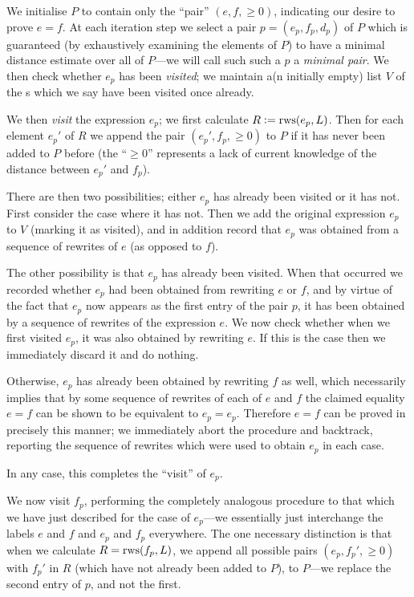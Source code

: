 \documentclass[12pt]{article}
\begin{document}
We initialise $P$ to contain only the ``pair'' $(e, f, \geq 0)$, indicating our desire to prove $e = f$. At each iteration step we select a pair $p = (e_p, f_p, d_p)$ of $P$ which is guaranteed (by exhaustively examining the elements of $P$) to have a minimal distance estimate over all of $P$---we will call such such a $p$ a \textit{minimal pair}. We then check whether $e_p$ has been \textit{visited}; we maintain a(n initially empty) list $V$ of the \expr{}s which we say have been visited once already.

We then \textit{visit} the expression $e_p$; we first calculate $R := \operatorname{rws}(e_p, L)$. Then for each element $e_p'$ of $R$ we append the pair $(e_p', f_p, \geq 0)$ to $P$ if it has never been added to $P$ before (the ``$\geq 0$'' represents a lack of current knowledge of the distance between $e_p'$ and $f_p$).

There are then two possibilities; either $e_p$ has already been visited or it has not. First consider the case where it has not. Then we add the original expression $e_p$ to $V$ (marking it as visited), and in addition record that $e_p$ was obtained from a sequence of rewrites of $e$ (as opposed to $f$).

The other possibility is that $e_p$ has already been visited. When that occurred we recorded whether $e_p$ had been obtained from rewriting $e$ or $f$, and by virtue of the fact that $e_p$ now appears as the first entry of the pair $p$, it has been obtained by a sequence of rewrites of the expression $e$. We now check whether when we first visited $e_p$, it was also obtained by rewriting $e$. If this is the case then we immediately discard it and do nothing.

Otherwise, $e_p$ has already been obtained by rewriting $f$ as well, which necessarily implies that by some sequence of rewrites of each of $e$ and $f$ the claimed equality $e = f$ can be shown to be equivalent to $e_p = e_p$. Therefore $e = f$ can be proved in precisely this manner; we immediately abort the procedure and backtrack, reporting the sequence of rewrites which were used to obtain $e_p$ in each case.

In any case, this completes the ``visit'' of $e_p$.

We now visit $f_p$, performing the completely analogous procedure to that which we have just described for the case of $e_p$---we essentially just interchange the labels $e$ and $f$ and $e_p$ and $f_p$ everywhere. The one necessary distinction is that when we calculate $R = \operatorname{rws}(f_p, L)$, we append all possible pairs $(e_p, f_p', \geq 0)$ with $f_p'$ in $R$ (which have not already been added to $P$), to $P$---we replace the second entry of $p$, and not the first.
\end{document}

